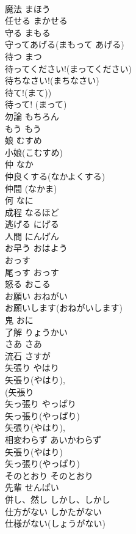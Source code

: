 \documentclass[8pt]{extreport}
\begin{document}
\begin{CJK}{UTF8}{min}
\\	魔法	まほう	
\\	任せる	まかせる	
\\	守る	まもる	
\\	守ってあげる(まもって あげる) 
\\	待つ	まつ	
\\	待ってください!(まってください)
\\	待ちなさい!(まちなさい)
\\	待て!(まて)) 
\\	待って! (まって)	
\\	勿論	もちろん	
\\	もう	もう	
\\	娘	むすめ	
\\	小娘(こむすめ) 
\\	仲	なか	
\\	仲良くする(なかよくする) 
\\	仲間 (なかま) 
\\	何	なに	
\\	成程	なるほど	
\\	逃げる	にげる	
\\	人間	にんげん	
\\	お早う	おはよう	
\\	おっす 
\\	尾っす	おっす	
\\	怒る	おこる	
\\	お願い	おねがい	
\\	お願いします(おねがいします)
\\	鬼	おに	
\\	了解	りょうかい	
\\	さあ	さあ	
\\	流石	さすが	
\\	矢張り	やはり	
\\	矢張り(やはり), 
\\	(矢張り 
\\	矢っ張り	やっぱり	
\\	矢っ張り(やっぱり) 
\\	矢張り(やはり), 
\\	相変わらず	あいかわらず	
\\	矢張り(やはり) 
\\	矢っ張り(やっぱり) 
\\	そのとおり	そのとおり	
\\	先輩	せんぱい	
\\	併し、然し	しかし、しかし	
\\	仕方がない	しかたがない	
\\	仕様がない(しょうがない) 

\end{CJK}
\end{document}
